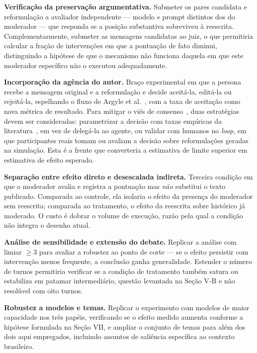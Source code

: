 \documentclass[conference]{IEEEtran} \IEEEoverridecommandlockouts %
\begin{document}
\textbf{Verificação da preservação argumentativa.} Submeter os pares candidata
e reformulação a avaliador independente — modelo e prompt distintos dos do
moderador — que responda se a posição substantiva sobreviveu à reescrita.
Complementarmente, submeter as mensagens candidatas ao juiz, o que permitiria
calcular a fração de intervenções em que a pontuação de fato diminui,
distinguindo a hipótese de que o mecanismo não funciona daquela em que este
moderador específico não o executou adequadamente.

\textbf{Incorporação da agência do autor.} Braço experimental em que a persona
recebe a mensagem original e a reformulação e decide aceitá-la, editá-la ou
rejeitá-la, espelhando o fluxo de Argyle et al.~\cite{argyle2023leveraging},
com a taxa de aceitação como nova métrica de resultado. Para mitigar o viés de
consenso~\cite{chuang2023simulating}, duas estratégias devem ser consideradas:
parametrizar a decisão com taxas empíricas da
literatura~\cite{katsaros2022reconsidering}, em vez de delegá-la ao agente, ou
validar com humanos no \textit{loop}, em que participantes reais tomam ou
avaliam a decisão sobre reformulações geradas na simulação. Esta é a frente que
converteria a estimativa de limite superior em estimativa de efeito esperado.

\textbf{Separação entre efeito direto e desescalada indireta.} Terceira condição
em que o moderador avalia e registra a pontuação mas \textit{não} substitui o
texto publicado. Comparada ao controle, ela isolaria o efeito da presença do
moderador sem reescrita; comparada ao tratamento, o efeito da reescrita sobre
histórico já moderado. O custo é dobrar o volume de execução, razão pela qual a
condição não integra o desenho atual.

\textbf{Análise de sensibilidade e extensão do debate.} Replicar a análise com
limiar $\geq 3$ para avaliar a robustez ao ponto de corte — se o efeito
persistir com intervenção menos frequente, a conclusão ganha generalidade.
Estender o número de turnos permitiria verificar se a condição de tratamento
também satura ou estabiliza em patamar intermediário, questão levantada na
Seção V-B e não resolúvel com oito turnos.

\textbf{Robustez a modelos e temas.} Replicar o experimento com modelos de
maior capacidade nos três papéis, verificando se o efeito medido aumenta
conforme a hipótese formulada na Seção VII, e ampliar o conjunto de temas para
além dos dois aqui empregados, incluindo assuntos de saliência específica ao
contexto brasileiro.
\end{document}
